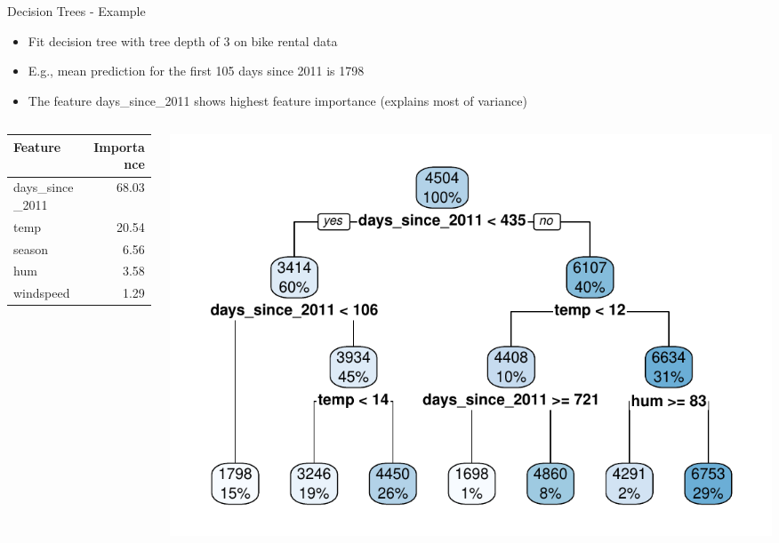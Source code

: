\documentclass[11pt,compress,t,notes=noshow, aspectratio=169, xcolor=table]{beamer}
\begin{document}
\begin{frame}{Decision Trees - Example}
\begin{itemize}
    \item Fit decision tree with tree depth of 3 on bike rental data
    \item E.g., mean prediction for the first 105 days since 2011 is 1798
    \item The feature days\_since\_2011 shows highest feature importance (explains most of variance)
\end{itemize}
\begin{columns}[T]
\begin{column}{0.4\textwidth}
\begin{table}[ht]
\centering
\begin{tabular}{lr}
  \hline
Feature & Importance \\ 
  \hline
days\_since\_2011 & 68.03 \\ 
  temp & 20.54 \\ 
  season & 6.56 \\ 
  hum & 3.58 \\ 
  windspeed & 1.29 \\ 
   \hline
\end{tabular}
\end{table}
\end{column}
\begin{column}{0.6\textwidth}
  \includegraphics[width = \textwidth]{figure/tree.pdf} 
\end{column}
\end{columns}
 
\end{frame}
\end{document}
